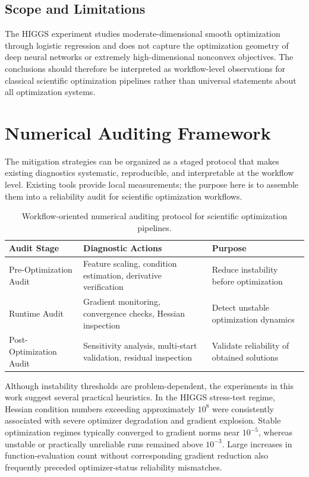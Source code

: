 \subsection{Scope and Limitations}

The HIGGS experiment studies moderate-dimensional smooth optimization through logistic regression and does not capture the optimization geometry of deep neural networks or extremely high-dimensional nonconvex objectives. The conclusions should therefore be interpreted as workflow-level observations for classical scientific optimization pipelines rather than universal statements about all optimization systems.

\section{Numerical Auditing Framework}

The mitigation strategies can be organized as a staged protocol that makes existing diagnostics systematic, reproducible, and interpretable at the workflow level. Existing tools provide local measurements; the purpose here is to assemble them into a reliability audit for scientific optimization workflows.

\begin{table}
\centering
\begin{tabular}{p{3cm} p{5cm} p{5cm}}
\hline
\textbf{Audit Stage} &
\textbf{Diagnostic Actions} &
\textbf{Purpose} \\
\hline
Pre-Optimization Audit &
Feature scaling, condition estimation, derivative verification &
Reduce instability before optimization \\

Runtime Audit &
Gradient monitoring, convergence checks, Hessian inspection &
Detect unstable optimization dynamics \\

Post-Optimization Audit &
Sensitivity analysis, multi-start validation, residual inspection &
Validate reliability of obtained solutions \\
\hline
\end{tabular}
\caption{Workflow-oriented numerical auditing protocol for scientific optimization pipelines.}
\label{tab:auditing}
\end{table}

Although instability thresholds are problem-dependent, the experiments in this work suggest several practical heuristics. In the HIGGS stress-test regime, Hessian condition numbers exceeding approximately \(10^{8}\) were consistently associated with severe optimizer degradation and gradient explosion. Stable optimization regimes typically converged to gradient norms near \(10^{-5}\), whereas unstable or practically unreliable runs remained above \(10^{-3}\). Large increases in function-evaluation count without corresponding gradient reduction also frequently preceded optimizer-status reliability mismatches.

